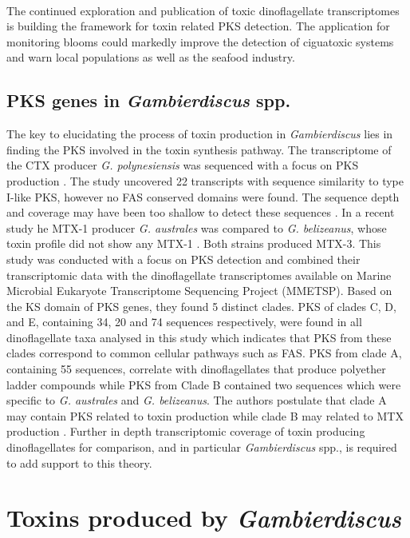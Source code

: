 \documentclass[12pt]{article}
\begin{document}
 \\ %
 The continued exploration and publication of toxic dinoflagellate transcriptomes is building the framework for toxin related PKS detection. The application for monitoring blooms could markedly improve the detection of ciguatoxic systems and warn local populations as well as the seafood industry.


\subsection{PKS genes in \emph{Gambierdiscus} spp.}
The key to elucidating the process of toxin production in \emph{Gambierdiscus} lies in finding the PKS involved in the toxin synthesis pathway.
The transcriptome of the CTX producer \emph{G. polynesiensis} was sequenced with a focus on PKS production \cite{pawlowiez2014transcriptome}. The study uncovered 22 transcripts with sequence similarity to type I-like PKS, however no FAS conserved domains were found. The sequence depth and coverage may have been too shallow to detect these sequences \cite{kohli2015polyketide}.
In a recent study he MTX-1 producer \emph{G. australes} was compared to \emph{G. belizeanus}, whose toxin profile did not show any MTX-1 \cite{kohli2015polyketide}. Both strains produced MTX-3. This study was conducted with a focus on PKS detection and combined their transcriptomic data with the dinoflagellate transcriptomes available on Marine Microbial Eukaryote Transcriptome Sequencing Project (MMETSP). Based on the KS domain of PKS genes, they found 5 distinct clades. PKS of clades C, D, and E, containing 34, 20 and 74 sequences respectively, were found in all dinoflagellate taxa analysed in this study which indicates that PKS from these clades correspond to common cellular pathways such as FAS. PKS from clade A, containing 55 sequences, correlate with dinoflagellates that produce polyether ladder compounds while PKS from Clade B contained two sequences which were specific to \emph{G. australes} and \emph{G. belizeanus}. The authors postulate that clade A may contain PKS related to toxin production while clade B may related to MTX production \cite{kohli2015polyketide}. Further in depth transcriptomic coverage of toxin producing dinoflagellates for comparison, and in particular \emph{Gambierdiscus} spp., is required to add support to this theory.

\section{Toxins produced by \emph{Gambierdiscus}}
\end{document}

